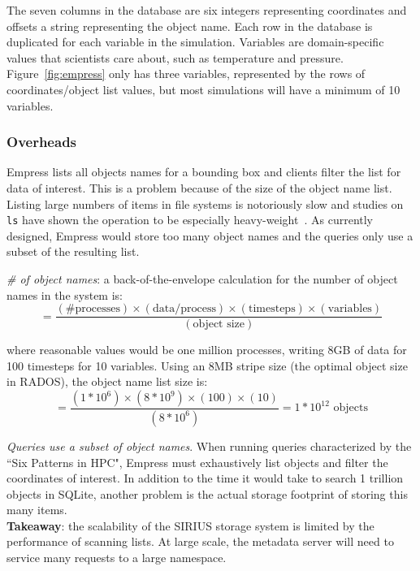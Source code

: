 The seven columns in the database are six integers representing coordinates and
offsets a string representing the object name.  Each row in the database is
duplicated for each variable in the simulation.  Variables are domain-specific
values that scientists care about, such as temperature and pressure.
Figure~\ref{fig:empress} only has three variables, represented by the rows of
coordinates/object list values, but most simulations will have a minimum of 10
variables.

\subsubsection{Overheads}

Empress lists all objects names for a bounding box and clients filter the list
for data of interest. This is a problem because of the size of the object name
list.  Listing large numbers of items in file systems is notoriously slow and
studies on \texttt{ls} have shown the operation to be especially
heavy-weight~\cite{carns:ipdps09-pvfs, eshel:fast10-panache}.  As currently
designed, Empress would store too many object names and the queries only use a
subset of the resulting list.

\emph{\# of object names}: a back-of-the-envelope calculation for the number of
object names in the system is:
\[=\frac
  {(\text{\# processes})\times
   (\text{data/process})\times
   (\text{timesteps})\times
   (\text{variables})}
  {(\text{object size})}
\]

where reasonable values would be one million processes, writing 8GB of data
for 100 timesteps for 10 variables. Using an 8MB stripe size (the optimal object size in RADOS), 
the object name list size is:
\[=\frac{(1*10^6)\times(8*10^{9})\times(100)\times(10)}{(8*10^6)}
  = 1*10^{12} \text{ objects}
\]

\emph{Queries use a subset of object names}. When running queries characterized
by the ``Six Patterns in HPC", Empress must exhaustively list objects and
filter the coordinates of interest.  In addition to the time it would take to
search 1 trillion objects in SQLite, another problem is the actual storage
footprint of storing this many items.\\

 \noindent\textbf{Takeaway}: the scalability of the SIRIUS storage system is
limited by the performance of scanning lists. At large scale, the metadata
server will need to service many requests to a large namespace.

